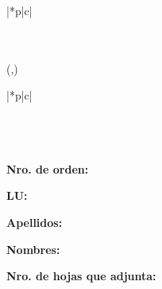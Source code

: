 {{{\begin{textblock}{\anchodegrilla}
\begin{tabular}{|*{\value{total}}{p{\anchodecasilla}|}c|}
          \hline
          \primerafila\\
          \hline
          \tercerafila\\
          \tercerafila\\
          \hline
        \end{tabular}
      \end{textblock}
    }
    {%
      \begin{textblock}{\anchodegrilla}(\izquierda,\abajo)
        \begin{tabular}{|*{\value{total}}{p{\anchodecasilla}|}c|}
          \hline
          \primerafila\\
          \rayitas
          \segundafila\\
          \hline
          \tercerafila\\
          \tercerafila\\
          \hline
        \end{tabular}
      \end{textblock}
    }
  }%
  \vspace{0.4cm}
  \textbf{Nro. de orden:}

  \textbf{LU:}

  \textbf{Apellidos:}

  \textbf{Nombres:}

  \textbf{Nro. de hojas que adjunta:}
  \vspace{0.5cm}
}




\setcounter{consigna}{0}

\newenvironment{consignas}{%
  \newcommand{\consigna}{\stepcounter{consigna}\textbf{\theconsigna.}}%
  \renewcommand{\ejercicio}[1]{\item ##1 }
  \renewcommand{\proc}[5][result]{\item
    \encabezadoDeProc{##1}{##2}{##3}{##4}\hspace{1em}##5}%
  \newcommand{\invariante}[2]{\item%
    {\normalfont\bfseries\ttfamily invariante}%
    \ ##1\hspace{1em}##2%
  }
  \renewcommand{\aux}[4]{\item%
    {\normalfont\bfseries\ttfamily aux\ }%
    {\normalfont\ttfamily ##1}%
    \ifthenelse{\equal{##2}{}}{}{\ (##2)}\ : ##3 \hspace{1em}##4%
  }
  \begin{list}{\consigna}{%
      \setlength{\itemsep}{0.5em}%
      \setlength{\parsep}{0cm}%
    }
}%
{\end{list}}



